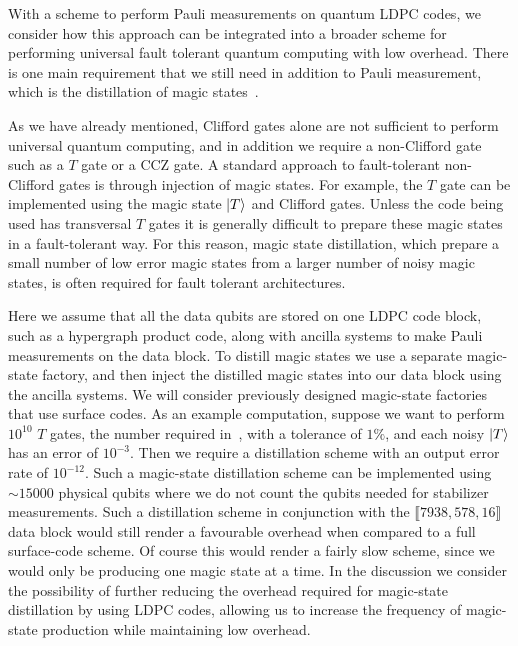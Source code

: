 \documentclass[reprint,
superscriptaddress,
 amsmath,amssymb,
 aps, longbibliography
]{revtex4-1}
\begin{document}
With a scheme to perform Pauli measurements on quantum LDPC codes, we consider how this approach can be integrated into a broader scheme for performing universal fault tolerant quantum computing with low overhead. There is one main requirement that we still need in addition to Pauli measurement, which is the distillation of magic states~\cite{Bravyi05}.

As we have already mentioned, Clifford gates alone are not sufficient to perform universal quantum computing, and in addition we require a non-Clifford gate such as a $T$ gate or a CCZ gate. A standard approach to fault-tolerant non-Clifford gates is through injection of magic states. For example, the $T$ gate can be implemented using the magic state $\ket{T}$ and Clifford gates. Unless the code being used has transversal $T$ gates it is generally difficult to prepare these magic states in a fault-tolerant way. For this reason, magic state distillation, which prepare a small number of low error magic states from a larger number of noisy magic states, is often required for fault tolerant architectures. 

Here we assume that all the data qubits are stored on one LDPC code block, such as a hypergraph product code, along with ancilla systems to make Pauli measurements on the data block. To distill magic states we use a separate magic-state factory, and then inject the distilled magic states into our data block using the ancilla systems. We will consider previously designed magic-state factories that use surface codes. As an example computation, suppose we want to perform $10^{10}$ $T$ gates, the number required in~\cite{Gidney21}, with a tolerance of $1\%$, and each noisy $\ket{T}$ has an error of $10^{-3}$. Then we require a distillation scheme with an output error rate of $10^{-12}$. Such a magic-state distillation scheme can be implemented using $\sim 15000$ physical qubits where we do not count the qubits needed for stabilizer measurements. Such a distillation scheme in conjunction with the $\llbracket 7938, 578, 16 \rrbracket$ data block would still render a favourable overhead when compared to a full surface-code scheme. Of course this would render a fairly slow scheme, since we would only be producing one magic state at a time. In the discussion we consider the possibility of further reducing the overhead required for magic-state distillation by using LDPC codes, allowing us to increase the frequency of magic-state production while maintaining low overhead.
\end{document}
